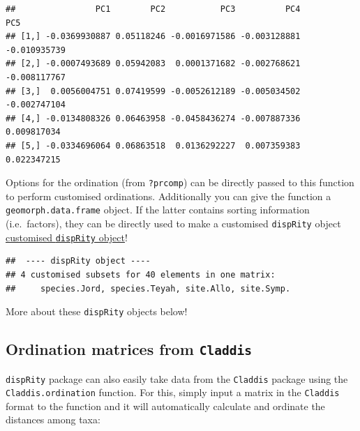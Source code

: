 \documentclass[]{book}
\newenvironment{Shaded}{\begin{snugshade}}{\end{snugshade}}
\newcommand{\CommentTok}[1]{\textcolor[rgb]{0.56,0.35,0.01}{\textit{#1}}}
\newcommand{\DataTypeTok}[1]{\textcolor[rgb]{0.13,0.29,0.53}{#1}}
\newcommand{\KeywordTok}[1]{\textcolor[rgb]{0.13,0.29,0.53}{\textbf{#1}}}
\newcommand{\NormalTok}[1]{#1}
\newcommand{\OperatorTok}[1]{\textcolor[rgb]{0.81,0.36,0.00}{\textbf{#1}}}
\newcommand{\StringTok}[1]{\textcolor[rgb]{0.31,0.60,0.02}{#1}}
\begin{document}
\begin{verbatim}
##                PC1        PC2           PC3          PC4          PC5
## [1,] -0.0369930887 0.05118246 -0.0016971586 -0.003128881 -0.010935739
## [2,] -0.0007493689 0.05942083  0.0001371682 -0.002768621 -0.008117767
## [3,]  0.0056004751 0.07419599 -0.0052612189 -0.005034502 -0.002747104
## [4,] -0.0134808326 0.06463958 -0.0458436274 -0.007887336  0.009817034
## [5,] -0.0334696064 0.06863518  0.0136292227  0.007359383  0.022347215
\end{verbatim}

Options for the ordination (from \texttt{?prcomp}) can be directly passed to this function to perform customised ordinations.
Additionally you can give the function a \texttt{geomorph.data.frame} object.
If the latter contains sorting information (i.e.~factors), they can be directly used to make a customised \texttt{dispRity} object \protect\hyperlink{customised-subsets}{customised \texttt{dispRity} object}!

\begin{Shaded}
\end{Shaded}

\begin{verbatim}
##  ---- dispRity object ---- 
## 4 customised subsets for 40 elements in one matrix:
##     species.Jord, species.Teyah, site.Allo, site.Symp.
\end{verbatim}

More about these \texttt{dispRity} objects below!

\hypertarget{Claddis-ordination}{%
\subsection{\texorpdfstring{Ordination matrices from \texttt{Claddis}}{Ordination matrices from Claddis}}\label{Claddis-ordination}}

\texttt{dispRity} package can also easily take data from the \texttt{Claddis} package using the \texttt{Claddis.ordination} function.
For this, simply input a matrix in the \texttt{Claddis} format to the function and it will automatically calculate and ordinate the distances among taxa:
\end{document}
